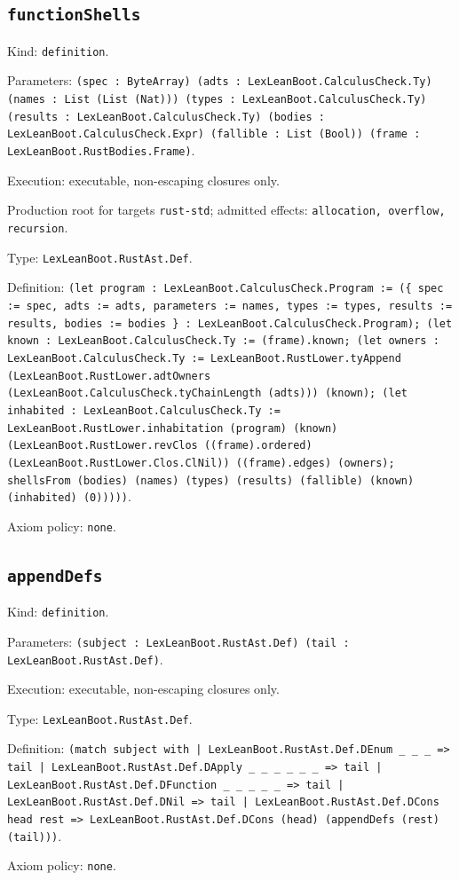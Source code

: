 \documentclass[11pt]{article}
\begin{document}
\subsection*{\texttt{functionShells}}
\noindent Kind: \texttt{definition}.\par
\noindent Parameters: \texttt{(spec : ByteArray) (adts : LexLeanBoot.CalculusCheck.Ty) (names : List (List (Nat))) (types : LexLeanBoot.CalculusCheck.Ty) (results : LexLeanBoot.CalculusCheck.Ty) (bodies : LexLeanBoot.CalculusCheck.Expr) (fallible : List (Bool)) (frame : LexLeanBoot.RustBodies.Frame)}.\par
\noindent Execution: executable, non-escaping closures only.\par
\noindent Production root for targets \texttt{rust-std}; admitted effects: \texttt{allocation, overflow, recursion}.\par
\noindent Type: \texttt{LexLeanBoot.RustAst.Def}.\par
\noindent Definition: \texttt{(let program : LexLeanBoot.CalculusCheck.Program := (\{ spec := spec, adts := adts, parameters := names, types := types, results := results, bodies := bodies \} : LexLeanBoot.CalculusCheck.Program); (let known : LexLeanBoot.CalculusCheck.Ty := (frame).known; (let owners : LexLeanBoot.CalculusCheck.Ty := LexLeanBoot.RustLower.tyAppend (LexLeanBoot.RustLower.adtOwners (LexLeanBoot.CalculusCheck.tyChainLength (adts))) (known); (let inhabited : LexLeanBoot.CalculusCheck.Ty := LexLeanBoot.RustLower.inhabitation (program) (known) (LexLeanBoot.RustLower.revClos ((frame).ordered) (LexLeanBoot.RustLower.Clos.ClNil)) ((frame).edges) (owners); shellsFrom (bodies) (names) (types) (results) (fallible) (known) (inhabited) (0)))))}.\par
\noindent Axiom policy: \texttt{none}.\par
\subsection*{\texttt{appendDefs}}
\noindent Kind: \texttt{definition}.\par
\noindent Parameters: \texttt{(subject : LexLeanBoot.RustAst.Def) (tail : LexLeanBoot.RustAst.Def)}.\par
\noindent Execution: executable, non-escaping closures only.\par
\noindent Type: \texttt{LexLeanBoot.RustAst.Def}.\par
\noindent Definition: \texttt{(match subject with | LexLeanBoot.RustAst.Def.DEnum \_ \_ \_ => tail | LexLeanBoot.RustAst.Def.DApply \_ \_ \_ \_ \_ \_ => tail | LexLeanBoot.RustAst.Def.DFunction \_ \_ \_ \_ \_ => tail | LexLeanBoot.RustAst.Def.DNil => tail | LexLeanBoot.RustAst.Def.DCons head rest => LexLeanBoot.RustAst.Def.DCons (head) (appendDefs (rest) (tail)))}.\par
\noindent Axiom policy: \texttt{none}.\par
\end{document}
